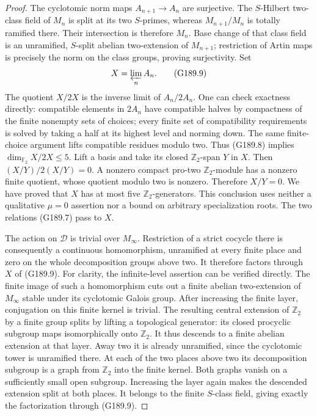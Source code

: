 \begin{proof}
The cyclotomic norm maps $A_{n+1}\to A_n$ are surjective.
The $S$-Hilbert two-class field of $M_n$ is split at its two
$S$-primes, whereas $M_{n+1}/M_n$ is totally ramified there.
Their intersection is therefore $M_n$.
Base change of that class field is an unramified, $S$-split
abelian two-extension of $M_{n+1}$; restriction of Artin maps
is precisely the norm on the class groups, proving surjectivity.
Set
\[
                      X=\varprojlim_n A_n.
 \tag{G189.9}
\]
The quotient $X/2X$ is the inverse limit of $A_n/2A_n$.
One can check exactness directly: compatible elements in $2A_n$
have compatible halves by compactness of the finite nonempty
sets of choices; every finite set of compatibility requirements
is solved by taking a half at its highest level and norming down.
The same finite-choice argument lifts compatible residues modulo
two.  Thus (G189.8) implies $\dim_{\mathbb F_2}X/2X\leq5$.
Lift a basis and take its closed $\mathbb Z_2$-span $Y$ in $X$.
Then $(X/Y)/2(X/Y)=0$.  A nonzero compact pro-two
$\mathbb Z_2$-module has a nonzero finite quotient, whose quotient
modulo two is nonzero.  Therefore $X/Y=0$.
We have proved that $X$ has at most five $\mathbb Z_2$-generators.
This conclusion uses neither a qualitative $\mu=0$ assertion
nor a bound on arbitrary specialization roots.
The two relations (G189.7) pass to $X$.

The action on $\mathscr D$ is trivial over $M_\infty$.
Restriction of a strict cocycle there is consequently a continuous
homomorphism, unramified at every finite place and zero on the
whole decomposition groups above two.
It therefore factors through $X$ of (G189.9).
For clarity, the infinite-level assertion can be verified directly.
The finite image of such a homomorphism cuts out a finite abelian
two-extension of $M_\infty$ stable under its cyclotomic Galois group.
After increasing the finite layer, conjugation on this finite
kernel is trivial.  The resulting central extension of
$\mathbb Z_2$ by a finite group splits by lifting a topological
generator: its closed procyclic subgroup maps isomorphically
onto $\mathbb Z_2$.
It thus descends to a finite abelian extension at that layer.
Away two it is already unramified, since the cyclotomic tower is
unramified there.  At each of the two places above two its
decomposition subgroup is a graph from $\mathbb Z_2$ into the
finite kernel.  Both graphs vanish on a sufficiently small open
subgroup.  Increasing the layer again makes the descended
extension split at both places.  It belongs to the finite
$S$-class field, giving exactly the factorization through (G189.9).


\end{proof}
